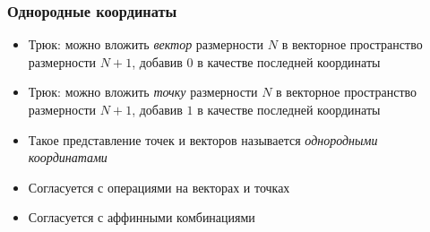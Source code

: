 \documentclass[10pt]{beamer}
\begin{document}
\begin{frame}[fragile]
\frametitle{Однородные координаты}
\begin{itemize}
\item Трюк: можно вложить \textit{вектор} размерности \begin{math}N\end{math} в векторное пространство размерности \begin{math}N+1\end{math}, добавив \begin{math}0\end{math} в качестве последней координаты
\pause
\item Трюк: можно вложить \textit{точку} размерности \begin{math}N\end{math} в векторное пространство размерности \begin{math}N+1\end{math}, добавив \begin{math}1\end{math} в качестве последней координаты
\pause
\item Такое представление точек и векторов называется \textit{однородными координатами}
\pause
\item Согласуется с операциями на векторах и точках
\pause
\item Согласуется с аффинными комбинациями
\end{itemize}
\end{frame}
\end{document}
